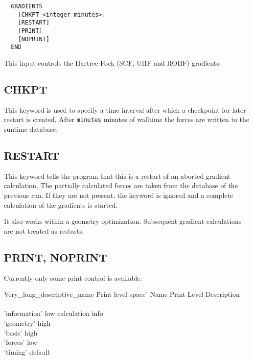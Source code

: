 \begin{verbatim}
  GRADIENTS 
    [CHKPT <integer minutes>]
    [RESTART]
    [PRINT]
    [NOPRINT]
  END
\end{verbatim}

  This input controls the Hartree-Fock (SCF, UHF and ROHF) gradients.  

\subsection{CHKPT}

  This keyword is used to specify a time interval after which a
  checkpoint for later restart is created. After \verb+minutes+
  minutes of walltime the forces are written to the runtime database.

\subsection{RESTART}

  This keyword tells the program that this is a restart of an aborted
  gradient calculation. The partially calculated forces are taken from
  the database of the previous run. If they are not present, the
  keyword is ignored and a complete calculation of the gradients is started.

  It also works within a geometry optimization. Subsequent gradient 
  calculations are not treated as restarts.

\subsection{PRINT, NOPRINT}

  Currently only some print control is available.

\begin{tabbing}
  Very\_long\_descriptive\_name \= Print level space \= \kill
  Name                   \> Print Level \> Description \\
                         \>        \> \\
        'information'   \>        low  \> calculation info\\
        'geometry'    \>          high \> \\
        'basis'        \>         high \> \\
        'forces'   \>             low \> \\
        'timing'   \>             default \> 
\end{tabbing}

